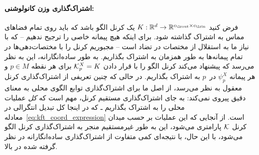 \paragraph{اشتراک‌گذاری وزن کانولوشنی:}
فرض کنید $K: \R^d \to \R^{\cout\times\cin}$ یک کرنل الگو باشد که باید روی تمام فضاهای مماس به اشتراک گذاشته شود.
برای اینکه هیچ پیمانه خاصی را ترجیح ندهیم -- که با نیاز ما به استقلال از مختصات در تضاد است -- مجبوریم کرنل را با مختصات‌دهی‌ها در تمام پیمانه‌ها به طور همزمان به اشتراک بگذاریم.
به طور ساده‌انگارانه، این به نظر می‌رسد که پیشنهاد می‌کند کرنل الگو را با قرار دادن $\mathcal{K}_p^X = K$ برای هر نقطه $p\in M$ و هر پیمانه $\psi_p^X$ در~$p$ به اشتراک بگذاریم.
در حالی که چنین تعریفی از اشتراک‌گذاری کرنل معقول به نظر می‌رسد، از اصل ما برای اشتراک‌گذاری توابع الگوی محلی به معنای دقیق پیروی نمی‌کند:
به جای اشتراک‌گذاری مستقیم کرنل، مهم است که \emph{کل} عملیات محلی را به اشتراک بگذاریم ـ که در اینجا کل
تبدیل انتگرالی در معادله~\eqref{eq:kft_coord_expression} است.
از آنجایی که این عملیات بر حسب میدان کرنل $\mathcal{K}$ پارامتری می‌شود، این به طور غیرمستقیم منجر به اشتراک‌گذاری کرنل الگو می‌شود، با این حال، با نتیجه‌ای کمی متفاوت از اشتراک‌گذاری ساده‌انگارانه در نظر گرفته شده در بالا.


